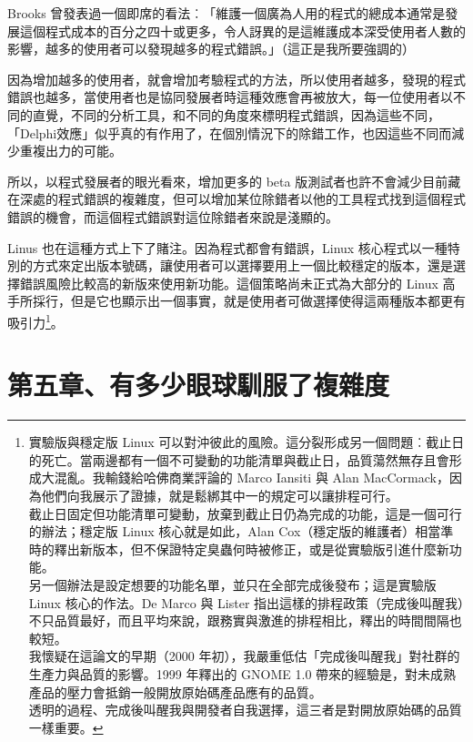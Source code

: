 \documentclass[12pt, a5paper]{book}
\begin{document}
Brooks
曾發表過一個即席的看法︰「維護一個廣為人用的程式的總成本通常是發展這個程式成本的百分之四十或更多，令人訝異的是這維護成本深受使用者人數的影響，越多的使用者可以發現越多的程式錯誤。」（這正是我所要強調的）

因為增加越多的使用者，就會增加考驗程式的方法，所以使用者越多，發現的程式錯誤也越多，當使用者也是協同發展者時這種效應會再被放大，每一位使用者以不同的直覺，不同的分析工具，和不同的角度來標明程式錯誤，因為這些不同，「Delphi效應」似乎真的有作用了，在個別情況下的除錯工作，也因這些不同而減少重複出力的可能。

所以，以程式發展者的眼光看來，增加更多的 beta
版測試者也許不會減少目前藏在深處的程式錯誤的複雜度，但可以增加某位除錯者以他的工具程式找到這個程式錯誤的機會，而這個程式錯誤對這位除錯者來說是淺顯的。

Linus 也在這種方式上下了賭注。因為程式都會有錯誤，Linux
核心程式以一種特別的方式來定出版本號碼，讓使用者可以選擇要用上一個比較穩定的版本，還是選擇錯誤風險比較高的新版來使用新功能。這個策略尚未正式為大部分的
Linux
高手所採行，但是它也顯示出一個事實，就是使用者可做選擇使得這兩種版本都更有吸引力\footnote{實驗版與穩定版
  Linux
  可以對沖彼此的風險。這分裂形成另一個問題︰截止日的死亡。當兩邊都有一個不可變動的功能清單與截止日，品質蕩然無存且會形成大混亂。我輸錢給哈佛商業評論的
  Marco Iansiti 與 Alan
  MacCormack，因為他們向我展示了證據，就是鬆綁其中一的規定可以讓排程可行。\\截止日固定但功能清單可變動，放棄到截止日仍為完成的功能，這是一個可行的辦法；穩定版
  Linux 核心就是如此，Alan
  Cox（穩定版的維護者）相當準時的釋出新版本，但不保證特定臭蟲何時被修正，或是從實驗版引進什麼新功能。\\另一個辦法是設定想要的功能名單，並只在全部完成後發布；這是實驗版
  Linux 核心的作法。De Marco 與 Lister
  指出這樣的排程政策（完成後叫醒我）不只品質最好，而且平均來說，跟務實與激進的排程相比，釋出的時間間隔也較短。\\我懷疑在這論文的早期（2000
  年初），我嚴重低估「完成後叫醒我」對社群的生產力與品質的影響。1999
  年釋出的 GNOME 1.0
  帶來的經驗是，對未成熟產品的壓力會抵銷一般開放原始碼產品應有的品質。\\透明的過程、完成後叫醒我與開發者自我選擇，這三者是對開放原始碼的品質一樣重要。}。

\newpage
\section{第五章、有多少眼球馴服了複雜度}\label{ux7b2cux4e94ux7ae0ux6709ux591aux5c11ux773cux7403ux99b4ux670dux4e86ux8907ux96dcux5ea6}
\end{document}
